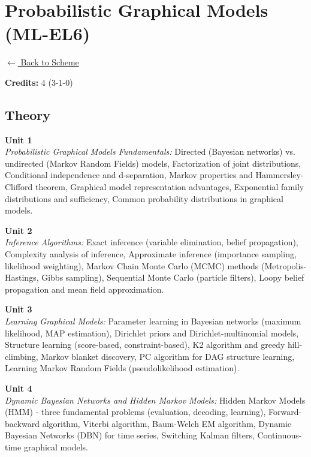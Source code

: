 \section*{Probabilistic Graphical Models (ML-EL6)}
\label{elec:ML_6}

\noindent \small{\hyperref[main:scheme]{$\leftarrow$ Back to Scheme}} \vspace{0.5cm}

\noindent \textbf{Credits:} 4 (3-1-0)

\subsection*{Theory}
\noindent\textbf{Unit 1} \\
\textit{Probabilistic Graphical Models Fundamentals:} Directed (Bayesian networks) vs. undirected (Markov Random Fields) models, Factorization of joint distributions, Conditional independence and d-separation, Markov properties and Hammersley-Clifford theorem, Graphical model representation advantages, Exponential family distributions and sufficiency, Common probability distributions in graphical models.

\vspace{0.3cm}

\noindent\textbf{Unit 2} \\
\textit{Inference Algorithms:} Exact inference (variable elimination, belief propagation), Complexity analysis of inference, Approximate inference (importance sampling, likelihood weighting), Markov Chain Monte Carlo (MCMC) methods (Metropolis-Hastings, Gibbs sampling), Sequential Monte Carlo (particle filters), Loopy belief propagation and mean field approximation.

\vspace{0.3cm}

\noindent\textbf{Unit 3} \\
\textit{Learning Graphical Models:} Parameter learning in Bayesian networks (maximum likelihood, MAP estimation), Dirichlet priors and Dirichlet-multinomial models, Structure learning (score-based, constraint-based), K2 algorithm and greedy hill-climbing, Markov blanket discovery, PC algorithm for DAG structure learning, Learning Markov Random Fields (pseudolikelihood estimation).

\vspace{0.3cm}

\noindent\textbf{Unit 4} \\
\textit{Dynamic Bayesian Networks and Hidden Markov Models:} Hidden Markov Models (HMM) - three fundamental problems (evaluation, decoding, learning), Forward-backward algorithm, Viterbi algorithm, Baum-Welch EM algorithm, Dynamic Bayesian Networks (DBN) for time series, Switching Kalman filters, Continuous-time graphical models.


